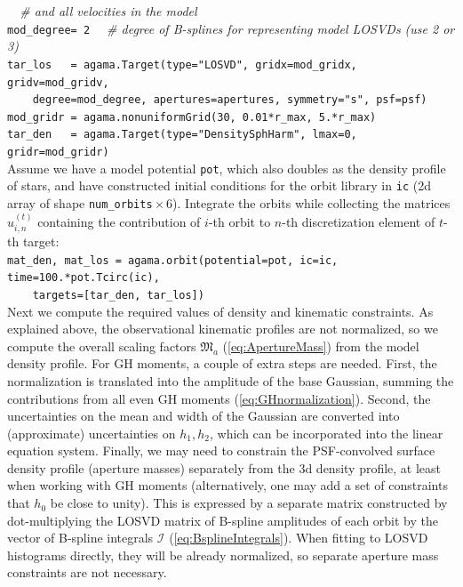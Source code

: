 \documentclass[12pt]{article}
\begin{document}
\textit{\color{Sepia} \ \ \# and all velocities in the model}\\
\texttt{mod_degree= 2}
\textit{\color{Sepia} \ \ \# degree of B-splines for representing model LOSVDs (use 2 or 3)}\\
\texttt{tar_los~~~= agama.Target(type="LOSVD", gridx=mod_gridx, gridv=mod_gridv,\\
\mbox{}~~~~degree=mod_degree, apertures=apertures, symmetry="s", psf=psf)\\
mod_gridr~= agama.nonuniformGrid(30, 0.01*r_max, 5.*r_max)\\
tar_den~~~= agama.Target(type="DensitySphHarm", lmax=0, gridr=mod_gridr)
}\\[2mm]
Assume we have a model potential \texttt{pot}, which also doubles as the density profile of stars, and have constructed initial conditions for the orbit library in \texttt{ic} (2d array of shape \texttt{num_orbits}${}\times 6$). Integrate the orbits while collecting the matrices $u_{i,n}^{(t)}$ containing the contribution of $i$-th orbit to $n$-th discretization element of $t$-th target:\\[2mm]
\texttt{mat_den, mat_los = agama.orbit(potential=pot, ic=ic, time=100.*pot.Tcirc(ic),\\
\mbox{}~~~~targets=[tar_den, tar_los])}\\[2mm]
Next we compute the required values of density and kinematic constraints. As explained above, the observational kinematic profiles are not normalized, so we compute the overall scaling factors $\mathfrak M_a$ (\ref{eq:ApertureMass}) from the model density profile. For GH moments, a couple of extra steps are needed. First, the normalization is translated into the amplitude of the base Gaussian, summing the contributions from all even GH moments (\ref{eq:GHnormalization}). Second, the uncertainties on the mean and width of the Gaussian are converted into (approximate) uncertainties on $h_1,h_2$, which can be incorporated into the linear equation system.
Finally, we may need to constrain the PSF-convolved surface density profile (aperture masses) separately from the 3d density profile, at least when working with GH moments (alternatively, one may add a set of constraints that $h_0$ be close to unity). This is expressed by a separate matrix constructed by dot-multiplying the LOSVD matrix of B-spline amplitudes of each orbit by the vector of B-spline integrals $\mathcal I$ (\ref{eq:BsplineIntegrals}). When fitting to LOSVD histograms directly, they will be already normalized, so separate aperture mass constraints are not necessary.\\[2mm]
\end{document}
